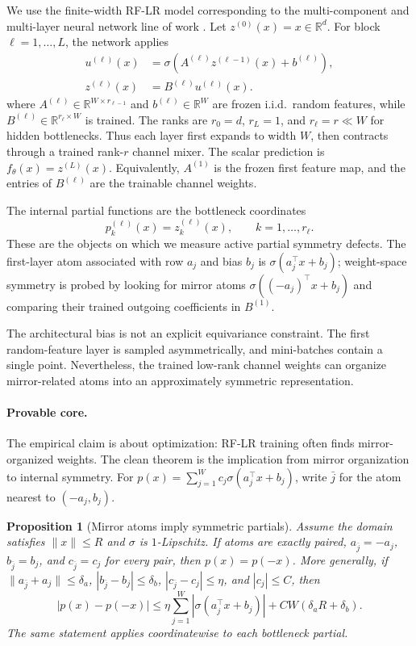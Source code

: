\documentclass[nohyperref]{article}
\newtheorem{proposition}{Proposition}
\begin{document}
We use the finite-width RF-LR model corresponding to the multi-component and multi-layer neural network line of work \citep{zhang2024structured}.
Let $z^{(0)}(x)=x\in\mathbb{R}^{d}$.
For block $\ell=1,\ldots,L$, the network applies
\begin{align*}
u^{(\ell)}(x)
&=
\sigma\!\left(A^{(\ell)} z^{(\ell-1)}(x)+b^{(\ell)}\right),\\
z^{(\ell)}(x)
&=
B^{(\ell)}u^{(\ell)}(x).
\end{align*}
where $A^{(\ell)}\in\mathbb{R}^{W\times r_{\ell-1}}$ and $b^{(\ell)}\in\mathbb{R}^{W}$ are frozen i.i.d.\ random features, while $B^{(\ell)}\in\mathbb{R}^{r_\ell\times W}$ is trained.
The ranks are $r_0=d$, $r_L=1$, and $r_\ell=r\ll W$ for hidden bottlenecks.
Thus each layer first expands to width $W$, then contracts through a trained rank-$r$ channel mixer.
The scalar prediction is $f_\theta(x)=z^{(L)}(x)$.
Equivalently, $A^{(1)}$ is the frozen first feature map, and the entries of $B^{(\ell)}$ are the trainable channel weights.

The internal partial functions are the bottleneck coordinates
\[
p_k^{(\ell)}(x)=z_k^{(\ell)}(x),
\qquad
k=1,\ldots,r_\ell.
\]
These are the objects on which we measure active partial symmetry defects.
The first-layer atom associated with row $a_j$ and bias $b_j$ is $\sigma(a_j^\top x+b_j)$; weight-space symmetry is probed by looking for mirror atoms $\sigma((-a_j)^\top x+b_j)$ and comparing their trained outgoing coefficients in $B^{(1)}$.

The architectural bias is not an explicit equivariance constraint.
The first random-feature layer is sampled asymmetrically, and mini-batches contain a single point.
Nevertheless, the trained low-rank channel weights can organize mirror-related atoms into an approximately symmetric representation.

\paragraph{Provable core.}
The empirical claim is about optimization: RF-LR training often finds mirror-organized weights.
The clean theorem is the implication from mirror organization to internal symmetry.
For $p(x)=\sum_{j=1}^{W}c_j\sigma(a_j^\top x+b_j)$, write $\bar j$ for the atom nearest to $(-a_j,b_j)$.

\begin{proposition}[Mirror atoms imply symmetric partials]
\label{prop:mirror-bound}
Assume the domain satisfies $\lVert x\rVert\le R$ and $\sigma$ is $1$-Lipschitz.
If atoms are exactly paired, $a_{\bar j}=-a_j$, $b_{\bar j}=b_j$, and $c_{\bar j}=c_j$ for every pair, then $p(x)=p(-x)$.
More generally, if $\lVert a_{\bar j}+a_j\rVert\le\delta_a$, $|b_{\bar j}-b_j|\le\delta_b$, $|c_{\bar j}-c_j|\le\eta$, and $|c_j|\le C$, then
\[
|p(x)-p(-x)|
\le
\eta\sum_{j=1}^{W}|\sigma(a_j^\top x+b_j)|
  + CW(\delta_a R+\delta_b).
\]
The same statement applies coordinatewise to each bottleneck partial.
\end{proposition}
\end{document}
